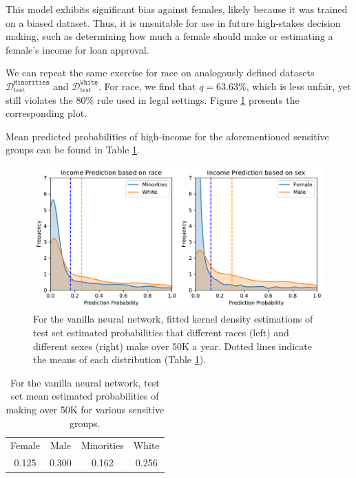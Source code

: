 \documentclass{article}
\begin{document}
This model exhibits significant bias against females, likely because it was trained on a biased dataset.  Thus, it is unsuitable for use in future high-stakes decision making, such as determining how much a female should make or estimating a female's income for loan approval. 

We can repeat the same exercise for race on analogously defined datasets $\mathcal{D}_\text{test}^\texttt{Minorities}$ and $\mathcal{D}_\text{test}^\texttt{White}$.  For race, we find that $q = 63.63\%$, which is less unfair, yet still violates the 80\% rule used in legal settings.  Figure \ref{vanilla-nn} presents the corresponding plot.

Mean predicted probabilities of high-income for the aforementioned sensitive groups can be found in Table \ref{vanilla-table}.

\begin{figure}[ht]
\vskip 0.2in
\begin{center}
\centerline{\includegraphics[width=\columnwidth]{img/vanilla-bias.pdf}}
\caption{For the vanilla neural network, fitted kernel density estimations of test set estimated probabilities that different races (left) and different sexes (right) make over 50K a year.  Dotted lines indicate the means of each distribution (Table \ref{vanilla-table}).}
\label{vanilla-nn}
\end{center}
\vskip -0.2in
\end{figure}

\begin{table}[h]
\centering
\begin{tabular}{c|c||c |c} 
 \hline
 Female & Male & Minorities & White \\ [0.5ex] 
 0.125 & 0.300 & 0.162 & 0.256 \\
 \hline
\end{tabular}
\caption{For the vanilla neural network, test set mean estimated probabilities of making over 50K for various sensitive groups.} \label{vanilla-table}
\end{table}
\end{document}
